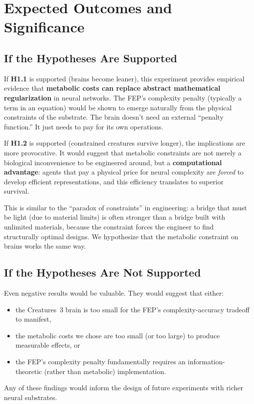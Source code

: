 \documentclass[12pt, a4paper]{article}
\begin{document}
\section{Expected Outcomes and Significance}
\label{sec:significance}

\subsection{If the Hypotheses Are Supported}

If \textbf{H1.1} is supported (brains become leaner), this experiment provides empirical evidence that \textbf{metabolic costs can replace abstract mathematical regularization} in neural networks. The FEP's complexity penalty (typically a term in an equation) would be shown to emerge naturally from the physical constraints of the substrate. The brain doesn't need an external ``penalty function.'' It just needs to pay for its own operations.

If \textbf{H1.2} is supported (constrained creatures survive longer), the implications are more provocative. It would suggest that metabolic constraints are not merely a biological inconvenience to be engineered around, but a \textbf{computational advantage}: agents that pay a physical price for neural complexity are \emph{forced} to develop efficient representations, and this efficiency translates to superior survival.

\begin{analogybox}
This is similar to the ``paradox of constraints'' in engineering: a bridge that must be light (due to material limits) is often stronger than a bridge built with unlimited materials, because the constraint forces the engineer to find structurally optimal designs. We hypothesize that the metabolic constraint on brains works the same way.
\end{analogybox}

\subsection{If the Hypotheses Are Not Supported}

Even negative results would be valuable. They would suggest that either:
\begin{itemize}[nosep]
  \item the Creatures~3 brain is too small for the FEP's complexity-accuracy tradeoff to manifest,
  \item the metabolic costs we chose are too small (or too large) to produce measurable effects, or
  \item the FEP's complexity penalty fundamentally requires an information-theoretic (rather than metabolic) implementation.
\end{itemize}
Any of these findings would inform the design of future experiments with richer neural substrates.
\end{document}
